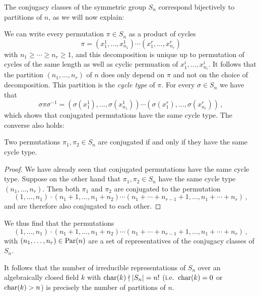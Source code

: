 \begin{example}
  \label{example: conjugacy classes of symmetric group}
  The conjugacy classes of the symmetric group $S_n$ correspond bijectively to partitions of $n$, as we will now explain:
  
  We can write every permutation $\pi \in S_n$ as a product of cycles
  \[
      \pi
    = \left( x^1_1, \dotsc, x^1_{n_1} \right)
      \dotsm
      \left( x^r_1, \dotsc, x^r_{n_r} \right)
  \]
  with $n_1 \geq \dotsb \geq n_r \geq 1$, and this decomposition is unique up to permutation of cycles of the same length as well as cyclic permuation of $x^i_1, \dotsc, x^i_{n_i}$.
  It follows that the partition $(n_1, \dotsc, n_r)$ of $n$ does only depend on $\pi$ and not on the choice of decomposition.
  This partition is the \emph{cycle type} of $\pi$.
  For every $\sigma \in S_n$ we have that
  \[
      \sigma \pi \sigma^{-1}
    = \left( \sigma(x^1_1), \dotsc, \sigma(x^1_{n_1}) \right)
      \dotsm
      \left( \sigma(x^r_1), \dotsc, \sigma(x^r_{n_r}) \right) \,,
  \]
  which shows that conjugated permutations have the same cycle type.
  The converse also holds:
  
  \begin{claim}
    Two permutations $\pi_1, \pi_2 \in S_n$ are conjugated if and only if they have the same cycle type.
  \end{claim}
  
  \begin{proof}
    We have already seen that conjugated permutations have the same cycle type.
    Suppose on the other hand that $\pi_1, \pi_2 \in S_n$ have the same cycle type $(n_1, \dotsc, n_r)$.
    Then both $\pi_1$ and $\pi_2$ are conjugated to the permutation
    \[
              (1, \dotsc, n_1)
      \cdot   (n_1 + 1, \dotsc, n_1 + n_2)
      \dotsm  (n_1 + \dotsb + n_{r-1} + 1, \dotsc, n_1 + \dotsb + n_r) \,,
    \]
    and are therefore also conjugated to each other.
  \end{proof}
  We thus find that the permutations
  \[
            (1, \dotsc, n_1)
    \cdot   (n_1 + 1, \dotsc, n_1 + n_2)
    \dotsm  (n_1 + \dotsb + n_{r-1} + 1, \dotsc, n_1 + \dotsb + n_r) \,,
  \]
  with $(n_1, \dotsc, n_r) \in \operatorname{Par}(n)$ are a set of representatives of the conjugacy classes of $S_n$.
  
  It follows that the number of irreducible representations of $S_n$ over an algebraically closed field $k$ with $\operatorname{char}(k) \nmid |S_n| = n!$ (i.e.\ $\operatorname{char}(k) = 0$ or $\operatorname{char}(k) > n$) is precisely the number of partitions of $n$.
\end{example}



